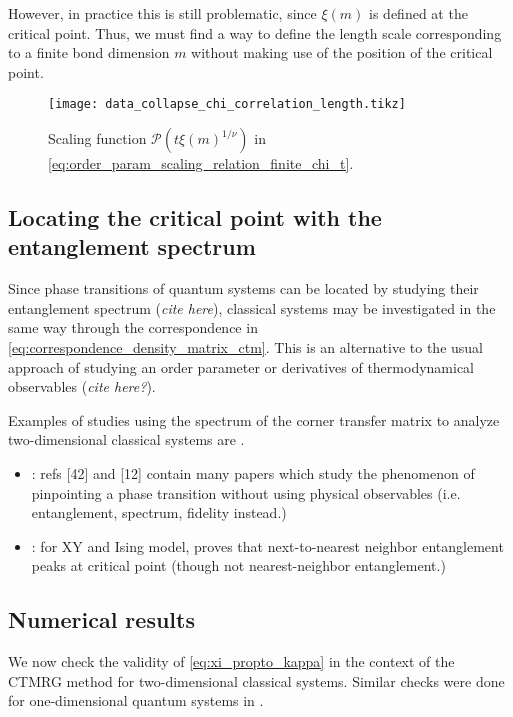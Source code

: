 However, in practice this is still problematic, since $\xi(m)$ is defined at the critical point. Thus, we must find a
way to define the length scale corresponding to a finite bond dimension $m$ without making use of the position of the
critical point.

\begin{figure}
  \texttt{[image: data\_collapse\_chi\_correlation\_length.tikz]}
  \caption{Scaling function $\mathcal{P}(t \xi(m)^{1/\nu})$ in
  \autoref{eq:order_param_scaling_relation_finite_chi_t}.}\label{fig:data_collapse_chi_correlation_length}
\end{figure}


\subsection{Locating the critical point with the entanglement spectrum}
Since phase transitions of quantum systems can be located by studying their entanglement spectrum (\emph{cite here}),
classical systems may be investigated in the same way through the correspondence in
\autoref{eq:correspondence_density_matrix_ctm}. This is an alternative to the usual approach of studying an order
parameter or derivatives of thermodynamical observables (\emph{cite here?}).

Examples of studies using the spectrum of the corner transfer matrix to analyze two-dimensional classical systems are
\cite{krvcmar2015reentrant, PhysRevE.94.022134, krvcmar2016phase}.


\begin{itemize}
  \item \cite{huang2017holographic}: refs [42] and [12] contain many papers which study the phenomenon of pinpointing
  a phase transition without using physical observables (i.e. entanglement, spectrum, fidelity instead.)
  \item \cite{osborne2002entanglement}: for XY and Ising model, proves that next-to-nearest neighbor entanglement peaks
  at critical point (though not nearest-neighbor entanglement.)
\end{itemize}


\subsection{Numerical results}

We now check the validity of \autoref{eq:xi_propto_kappa} in the context of the CTMRG method for two-dimensional
classical systems. Similar checks were done for one-dimensional quantum systems in \cite{tagliacozzo2008scaling}.

